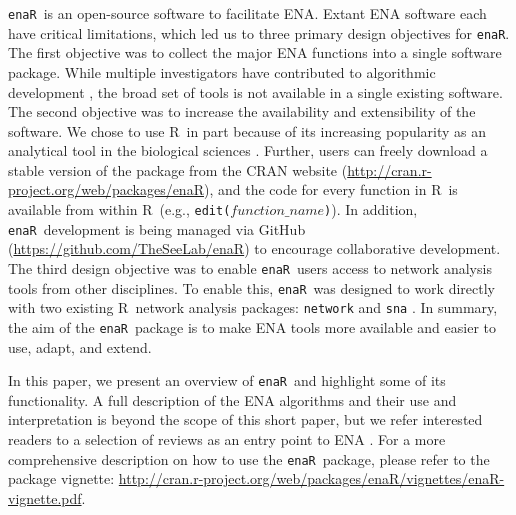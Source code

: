 \documentclass[11pt]{article}
\newcommand{\R}{R}
\newcommand{\enaR}{\texttt{enaR}}
\begin{document}
\begin{spacing}{2}
\enaR\ is an open-source software to facilitate ENA.  Extant ENA
software \citep{ulanowicz91, kazanci07, allesina04_wand,
  christensen04, fath06} each have critical limitations, which led us
to three primary design objectives for \enaR .
The first objective was to collect the major ENA functions into a
single software package.  While multiple investigators have
contributed to algorithmic development \citep[e.g.,][]{finn76,
  ulanowicz86, ulanowicz91, fath99_review, allesina03}, the broad set
of tools is not available in a single existing software.  The second
objective was to increase the availability and extensibility of the
software. We chose to use \R\ in part because of its
increasing popularity as an analytical tool in the biological sciences
\citep[e.g.,][]{dixon2003vegan, metcalf2012, revell2012phytools}.
Further, users can freely download a stable version of the package
from the CRAN website
(\url{http://cran.r-project.org/web/packages/enaR}), and the code for
every function in \R\ is available from within \R\ (e.g.,
\texttt{edit($function\_name$)}).  In addition, \enaR\ development is being managed
via GitHub (\url{https://github.com/TheSeeLab/enaR}) to encourage
collaborative development.  The third design objective was to enable
\enaR\ users access to network analysis tools from other
disciplines.  To enable this, \enaR\ was designed to work directly
with two existing \R\ network analysis packages:  \texttt{network}
\citep{butts08_network} and \texttt{sna} \citep{butts08_social}.  In
summary, the aim of the \enaR\ package is to make ENA tools more
available and easier to use, adapt, and extend.

In this paper, we present an overview of \enaR\ and highlight some of
its functionality.  A full description of the ENA algorithms and their
use and interpretation is beyond the scope of this short paper, but we
refer interested readers to a selection of reviews as an entry point
to ENA \citep{fath99_review, ulanowicz97, fath06, schramski11,
  jorgensen07_newecology}.  For a more comprehensive description on
how to use the \enaR\ package, please refer to the package vignette:
\url{http://cran.r-project.org/web/packages/enaR/vignettes/enaR-vignette.pdf}.


\end{spacing}
\end{document}

